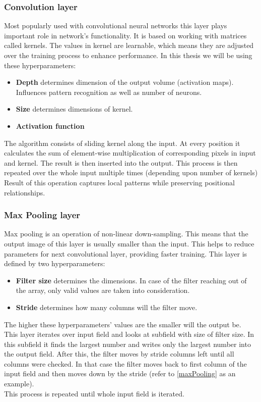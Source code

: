 \subsubsection{Convolution layer}
Most popularly used with convolutional neural networks \cite{convolutional} this layer plays important role in network's functionality. It is based on working with matrices called kernels.  The values in kernel are learnable, which means they are adjusted over the training process to enhance performance. In this thesis we will be using these hyperparameters:
\begin{itemize}
	\item \textbf{Depth} determines dimension of the output volume (activation maps). Influences pattern recognition as well as number of neurons.
	\item \textbf{Size} determines dimensions of kernel.
	\item \textbf{Activation function}
\end{itemize}
The algorithm consists of sliding kernel along the input. At every position it calculates the sum of element-wise multiplication of corresponding pixels in input and kernel. The result is then inserted into the output. This process is then repeated over the whole input multiple times (depending upon number of kernels) %
Result of this operation captures local patterns while preserving positional relationships.


\subsubsection{Max Pooling layer}
Max pooling is an operation of non-linear down-sampling. This means that the output image of this layer is usually smaller than the input. This helps to reduce parameters for next convolutional layer, providing faster training.  This layer is defined by two hyperparameters:

\begin{itemize}
	\item \textbf{Filter size} determines the dimensions. In case of the filter reaching out of the array, only valid values are taken into consideration.
	\item \textbf{Stride} determines how many columns will the filter move.
\end{itemize}

The higher these hyperparameters' values are the smaller will the output be.\\
This layer iterates over input field and looks at subfield with size of filter size. In this subfield it finds the largest number and writes only the largest number into the output field. After this, the filter moves by stride columns left until all columns were checked. In that case the filter moves back to first column of the input field and then moves down by the stride (refer to \ref{maxPooling} as an example).\\ This process is repeated until whole input field is iterated.

